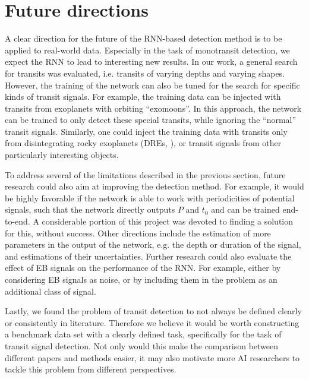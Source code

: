 
\section{Future directions}

A clear direction for the future of the RNN-based detection method is to be applied to real-world data. Especially in the task of monotransit detection, we expect the RNN to lead to interesting new results. In our work, a general search for transits was evaluated, i.e. transits of varying depths and varying shapes. However, the training of the network can also be tuned for the search for specific kinds of transit signals. For example, the training data can be injected with transits from exoplanets with orbiting ``exomoons''.  In this approach, the network can be trained to only detect these special transits, while ignoring the ``normal'' transit signals. Similarly, one could inject the training data with transits only from disintegrating rocky exoplanets (DREs, \cite{rappaport2012possible}), or transit signals from other particularly interesting objects.

To address several of the limitations described in the previous section, future research could also aim at improving the detection method. For example, it would be highly favorable if the network is able to work with periodicities of potential signals, such that the network directly outputs $P$ and $t_0$ and can be trained end-to-end. A considerable portion of this project was devoted to finding a solution for this, without success.  Other directions include the
estimation of more parameters in the output of the network, e.g. the depth or duration of the signal, and estimations of their uncertainties. Further research could also evaluate the effect of EB signals on the performance of the RNN. For example, either by considering EB signals as noise, or by including them in the problem as an additional class of signal.

Lastly, we found the problem of transit detection to not always be defined clearly or consistently in literature.  Therefore we believe it would be worth constructing a benchmark data set with a clearly defined task, specifically for the task of transit signal detection. Not only would this make the comparison between different papers and methods easier, it may also motivate more AI researchers to tackle this problem from different perspectives.

